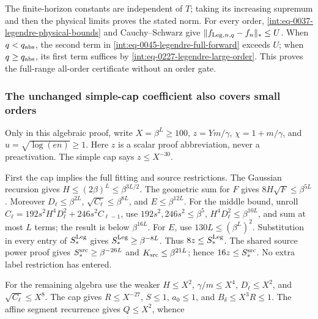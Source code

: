 
The finite-horizon constants are independent of \(T\); taking its increasing supremum and then the physical limits proves the stated norm. For every order, \eqref{int:eq-0037-legendre-physical-bounds} and Cauchy--Schwarz give \(\|f_{{\rm Leg},\allowbreak n,\allowbreak q}-f_n\|_*\le U\). When \(q<q_{\rm abs}\), the second term in \eqref{int:eq-0045-legendre-full-forward} exceeds \(U\); when \(q\ge q_{\rm abs}\), its first term suffices by \eqref{int:eq-0227-legendre-large-order}. This proves the full-range all-order certificate without an order gate.


\subsubsection{The unchanged simple-cap coefficient also covers small orders}
\label{int:legendre-simple-cap-proof}


Only in this algebraic proof, write \(X=\beta^L\ge100\), \(z=Ym/\gamma\), \(\chi=1+m/\gamma\), and \(u=\sqrt{\log(en)}\ge1\). Here \(z\) is a scalar proof abbreviation, never a preactivation. The simple cap says \(z\le X^{-30}\).



First the cap implies the full fitting and source restrictions. The Gaussian recursion gives \(H\le(2\beta)^L\le\beta^{3L/2}\). The geometric sum for \(F\) gives \(8H\sqrt F\le\beta^{5L}\). Moreover \(D_\ell\le\beta^{2L}\), \(\sqrt{C_\ell}\le\beta^{8L}\), and \(E\le\beta^{12L}\). For the middle bound, unroll \(C_\ell=192s^2H^4D_\ell^2+246s^2C_{\ell-1}\), use \(192s^2,\allowbreak 246s^2\le\beta^5\), \(H^4D_\ell^2\le\beta^{10L}\), and sum at most \(L\) terms; the result is below \(\beta^{16L}\). For \(E\), use \(130L\le(\beta^L)^2\). Substitution in every entry of \(S_*^{\rm Leg}\) gives \(S_*^{\rm Leg}\ge\beta^{-8L}\). Thus \(8z\le S_*^{\rm Leg}\). The shared source power proof gives \(S_*^{\rm src}\ge\beta^{-26L}\) and \(K_{\rm src}\le\beta^{21L}\); hence \(16z\le S_*^{\rm src}\). No extra label restriction has entered.



For the remaining algebra use the weaker \(H\le X^2\), \(\gamma/m\le X^4\), \(D_\ell\le X^2\), and \(\sqrt{C_\ell}\le X^8\). The cap gives \(R\le X^{-27}\), \(S\le1\), \(a_0\le1\), and \(B_\delta\le X^3R\le1\). The affine segment recurrence gives \(Q\le X^2\), whence



